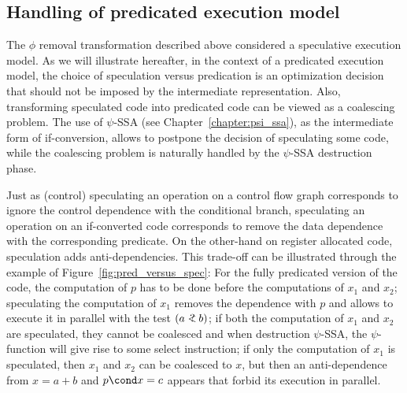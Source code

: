\subsection{Handling of predicated execution model}

The $\phi$ removal transformation described above considered a speculative execution model. As we will illustrate hereafter, in the context of a predicated execution model, the choice of speculation versus predication is an optimization decision that should not be imposed by the intermediate representation. Also, transforming speculated code into predicated code can be viewed as a coalescing problem. The use of $\psi$-SSA (see Chapter~\ref{chapter:psi_ssa}), as the intermediate form of if-conversion, allows to postpone the decision of speculating some code, while the coalescing problem is naturally handled by the $\psi$-SSA destruction phase. 

Just as (control) speculating an operation on a control flow graph corresponds to ignore the control dependence with the conditional branch, speculating an operation on an if-converted code corresponds to remove the data dependence with the corresponding predicate. On the other-hand on register allocated code, speculation adds anti-dependencies. This trade-off can be illustrated through the example of Figure~\ref{fig:pred_versus_spec}: For the fully predicated version of the code, the computation of $p$ has to be done before the computations of $x_1$ and $x_2$; speculating the computation of $x_1$ removes the dependence with $p$ and allows to execute it in parallel with the test $(a<\hspace{-.6em}?\ b)$; if both the computation of $x_1$ and $x_2$ are speculated, they cannot be coalesced and when destruction $\psi$-SSA, the $\psi$-function will give rise to some select instruction; if only the computation of $x_1$ is speculated, then $x_1$ and $x_2$ can be coalesced to $x$, but then an anti-dependence from $x=a+b$ and $p\cond x = c $ appears that forbid its  execution in parallel.

